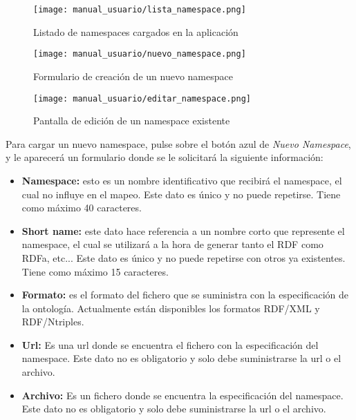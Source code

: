 \newpage

\begin{figure}[H]
    \begin{center}
        \texttt{[image: manual\_usuario/lista\_namespace.png]}
    \end{center}
    \caption{Listado de namespaces cargados en la aplicación}
    \label{fig:lista_namespace}
\end{figure}

\begin{figure}[H]
    \begin{center}
        \texttt{[image: manual\_usuario/nuevo\_namespace.png]}
    \end{center}
    \caption{Formulario de creación de un nuevo namespace}
    \label{fig:nuevo_namespace}
\end{figure}

\begin{figure}[H]
    \begin{center}
        \texttt{[image: manual\_usuario/editar\_namespace.png]}
    \end{center}
    \caption{Pantalla de edición de un namespace existente}
    \label{fig:editar_namespace}
\end{figure}

Para cargar un nuevo namespace, pulse sobre el botón azul de
\textit{Nuevo Namespace}, y le aparecerá un formulario donde se le solicitará
la siguiente información:
\begin{itemize}
    \item \textbf{Namespace:} esto es un nombre identificativo que recibirá el
        namespace, el cual no influye en el mapeo. Este dato es único y no puede
        repetirse. Tiene como máximo 40 caracteres.
    \item \textbf{Short name:} este dato hace referencia a un nombre corto que
        represente el namespace, el cual se utilizará a la hora de generar tanto
        el RDF como RDFa, etc... Este dato es único y no puede repetirse con
        otros ya existentes. Tiene como máximo 15 caracteres.
    \item \textbf{Formato:} es el formato del fichero que se suministra con la
        especificación de la ontología. Actualmente están disponibles los
        formatos RDF/XML y RDF/Ntriples.
    \item \textbf{Url:} Es una url donde se encuentra el fichero con la
        especificación del namespace. Este dato no es obligatorio y solo debe
        suministrarse la url o el archivo.
    \item \textbf{Archivo:} Es un fichero donde se encuentra la especificación
        del namespace. Este dato no es obligatorio y solo debe suministrarse la
        url o el archivo.
\end{itemize}

